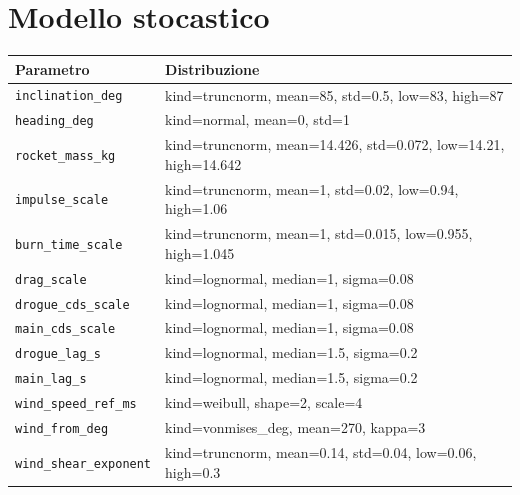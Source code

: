 \documentclass[11pt,a4paper]{article}
\begin{document}
\section{Modello stocastico}
\begin{table}[H]\centering\begin{tabular}{ll}\toprule
Parametro & Distribuzione \\ \midrule
\texttt{inclination\_deg} & kind=truncnorm, mean=85, std=0.5, low=83, high=87 \\
\texttt{heading\_deg} & kind=normal, mean=0, std=1 \\
\texttt{rocket\_mass\_kg} & kind=truncnorm, mean=14.426, std=0.072, low=14.21, high=14.642 \\
\texttt{impulse\_scale} & kind=truncnorm, mean=1, std=0.02, low=0.94, high=1.06 \\
\texttt{burn\_time\_scale} & kind=truncnorm, mean=1, std=0.015, low=0.955, high=1.045 \\
\texttt{drag\_scale} & kind=lognormal, median=1, sigma=0.08 \\
\texttt{drogue\_cds\_scale} & kind=lognormal, median=1, sigma=0.08 \\
\texttt{main\_cds\_scale} & kind=lognormal, median=1, sigma=0.08 \\
\texttt{drogue\_lag\_s} & kind=lognormal, median=1.5, sigma=0.2 \\
\texttt{main\_lag\_s} & kind=lognormal, median=1.5, sigma=0.2 \\
\texttt{wind\_speed\_ref\_ms} & kind=weibull, shape=2, scale=4 \\
\texttt{wind\_from\_deg} & kind=vonmises\_deg, mean=270, kappa=3 \\
\texttt{wind\_shear\_exponent} & kind=truncnorm, mean=0.14, std=0.04, low=0.06, high=0.3 \\
\bottomrule\end{tabular}\end{table}
\end{document}
